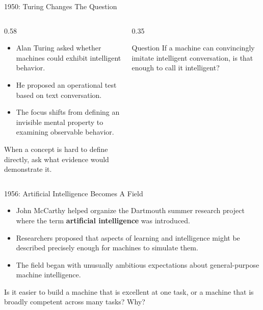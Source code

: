 \documentclass[aspectratio=169]{beamer}
\begin{document}
\begin{frame}{1950: Turing Changes The Question}
  \begin{columns}[T,onlytextwidth]
    \begin{column}{0.58\textwidth}
      \begin{itemize}
        \item Alan Turing asked whether machines could exhibit intelligent behavior.
        \item He proposed an operational test based on text conversation.
        \item The focus shifts from defining an invisible mental property to examining observable behavior.
      \end{itemize}
      \vspace{0.10in}
      \begin{keyidea}
        When a concept is hard to define directly, ask what evidence would demonstrate it.
      \end{keyidea}
    \end{column}
    \begin{column}{0.35\textwidth}
      \begin{block}{Question}
        If a machine can convincingly imitate intelligent conversation, is that enough to call it intelligent?
      \end{block}
    \end{column}
  \end{columns}
\end{frame}

\begin{frame}{1956: Artificial Intelligence Becomes A Field}
  \begin{itemize}
    \item John McCarthy helped organize the Dartmouth summer research project where the term \textbf{artificial intelligence} was introduced.
    \item Researchers proposed that aspects of learning and intelligence might be described precisely enough for machines to simulate them.
    \item The field began with unusually ambitious expectations about general-purpose machine intelligence.
  \end{itemize}
  \vspace{0.14in}
  \begin{activity}
    Is it easier to build a machine that is excellent at one task, or a machine that is broadly competent across many tasks? Why?
  \end{activity}
\end{frame}
\end{document}
